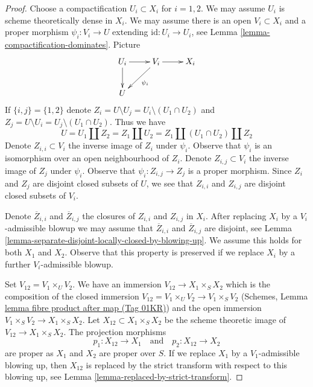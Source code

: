 \documentclass{amsart}
\theoremstyle{plain}
\theoremstyle{definition}
\theoremstyle{remark}
\numberwithin{equation}{subsection}
\begin{document}
\begin{proof}
Choose a compactification $U_i \subset X_i$ for $i = 1, 2$. We may
assume $U_i$ is scheme theoretically dense in $X_i$. We may assume there
is an open $V_i \subset X_i$ and a proper morphism
$\psi_i : V_i \to U$ extending $\text{id} : U_i \to U_i$, see
Lemma \ref{lemma-compactification-dominates}. Picture
$$
\xymatrix{
U_i \ar[r] \ar[d] & V_i \ar[r] \ar[dl]^{\psi_i} & X_i \\
U
}
$$
If $\{i, j\} = \{1, 2\}$ denote
$Z_i = U \setminus U_j = U_i \setminus (U_1 \cap U_2)$
and
$Z_j = U \setminus U_i = U_j \setminus (U_1 \cap U_2)$.
Thus we have
$$
U = U_1 \amalg Z_2 = Z_1 \amalg U_2 = Z_1 \amalg (U_1 \cap U_2) \amalg Z_2
$$
Denote $Z_{i, i} \subset V_i$ the inverse image of $Z_i$ under $\psi_i$.
Observe that $\psi_i$ is an isomorphism over an open neighbourhood of $Z_i$.
Denote $Z_{i, j} \subset V_i$ the inverse image of $Z_j$ under $\psi_i$.
Observe that $\psi_i : Z_{i, j} \to Z_j$ is a proper morphism.
Since $Z_i$ and $Z_j$ are disjoint closed subsets of
$U$, we see that $Z_{i, i}$ and $Z_{i, j}$ are disjoint closed subsets
of $V_i$.

\medskip\noindent
Denote $\overline{Z}_{i, i}$ and $\overline{Z}_{i, j}$ the closures of
$Z_{i, i}$ and $Z_{i, j}$ in $X_i$. After replacing $X_i$ by a
$V_i$-admissible blowup we may assume that
$\overline{Z}_{i, i}$ and $\overline{Z}_{i, j}$ are disjoint, see
Lemma \ref{lemma-separate-disjoint-locally-closed-by-blowing-up}.
We assume this holds for both $X_1$ and $X_2$.
Observe that this property is preserved if we replace $X_i$
by a further $V_i$-admissible blowup.

\medskip\noindent
Set $V_{12} = V_1 \times_U V_2$. We have an immersion
$V_{12} \to X_1 \times_S X_2$ which is the composition of the closed
immersion $V_{12} = V_1 \times_U V_2 \to V_1 \times_S V_2$
(Schemes, Lemma \href{https://stacks.math.columbia.edu/tag/01KR}{lemma fibre product after map (Tag 01KR)})
and the open immersion $V_1 \times_S V_2 \to X_1 \times_S X_2$.
Let $X_{12} \subset X_1 \times_S X_2$ be the scheme theoretic
image of $V_{12} \to X_1 \times_S X_2$. The projection morphisms
$$
p_1 : X_{12} \to X_1
\quad\text{and}\quad
p_2 : X_{12} \to X_2
$$
are proper as $X_1$ and $X_2$ are proper over $S$. If we replace $X_1$ by a
$V_1$-admissible blowing up, then $X_{12}$ is replaced by
the strict transform with respect to this blowing up, see
Lemma \ref{lemma-replaced-by-strict-transform}.


\end{proof}
\end{document}
